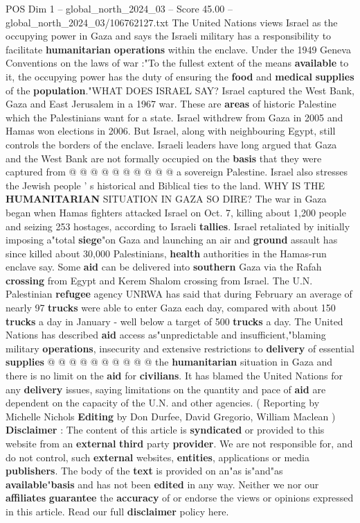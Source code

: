 \begin{textsample}{POS Dim 1 – global\_north\_2024\_03 – Score 45.00 – global\_north\_2024\_03/106762127.txt}
The United Nations views Israel as the occupying power in Gaza and says the Israeli military has a responsibility to facilitate \textbf{humanitarian} \textbf{operations} within the enclave.
Under the 1949 Geneva Conventions on the laws of war :"To the fullest extent of the means \textbf{available} to it, the occupying power has the duty of ensuring the \textbf{food} and \textbf{medical} \textbf{supplies} of the \textbf{population}."WHAT DOES ISRAEL SAY?
Israel captured the West Bank, Gaza and East Jerusalem in a 1967 war.
These are \textbf{areas} of historic Palestine which the Palestinians want for a state.
Israel withdrew from Gaza in 2005 and Hamas won elections in 2006.
But Israel, along with neighbouring Egypt, still controls the borders of the enclave.
Israeli leaders have long argued that Gaza and the West Bank are not formally occupied on the \textbf{basis} that they were captured from @ @ @ @ @ @ @ @ @ @ a sovereign Palestine.
Israel also stresses the Jewish people ' s historical and Biblical ties to the land.
WHY IS THE \textbf{HUMANITARIAN} SITUATION IN GAZA SO DIRE?
The war in Gaza began when Hamas fighters attacked Israel on Oct. 7, killing about 1,200 people and seizing 253 hostages, according to Israeli \textbf{tallies}.
Israel retaliated by initially imposing a"total \textbf{siege}"on Gaza and launching an air and \textbf{ground} assault has since killed about 30,000 Palestinians, \textbf{health} authorities in the Hamas-run enclave say.
Some \textbf{aid} can be delivered into \textbf{southern} Gaza via the Rafah \textbf{crossing} from Egypt and Kerem Shalom crossing from Israel.
The U.N.
Palestinian \textbf{refugee} agency UNRWA has said that during February an average of nearly 97 \textbf{trucks} were able to enter Gaza each day, compared with about 150 \textbf{trucks} a day in January - well below a target of 500 \textbf{trucks} a day.
The United Nations has described \textbf{aid} access as"unpredictable and insufficient,"blaming military \textbf{operations}, insecurity and extensive restrictions to \textbf{delivery} of essential \textbf{supplies} @ @ @ @ @ @ @ @ @ @ the \textbf{humanitarian} situation in Gaza and there is no limit on the \textbf{aid} for \textbf{civilians}.
It has blamed the United Nations for any \textbf{delivery} issues, saying limitations on the quantity and pace of \textbf{aid} are dependent on the capacity of the U.N. and other agencies. ( Reporting by Michelle Nichols \textbf{Editing} by Don Durfee, David Gregorio, William Maclean ) \textbf{Disclaimer} : The content of this article is \textbf{syndicated} or provided to this website from an \textbf{external} \textbf{third} party \textbf{provider}.
We are not responsible for, and do not control, such \textbf{external} websites, \textbf{entities}, applications or media \textbf{publishers}.
The body of the \textbf{text} is provided on an"as is"and"as \textbf{available}"\textbf{basis} and has not been \textbf{edited} in any way.
Neither we nor our \textbf{affiliates} \textbf{guarantee} the \textbf{accuracy} of or endorse the views or opinions expressed in this article.
Read our full \textbf{disclaimer} policy here.


\end{textsample}
